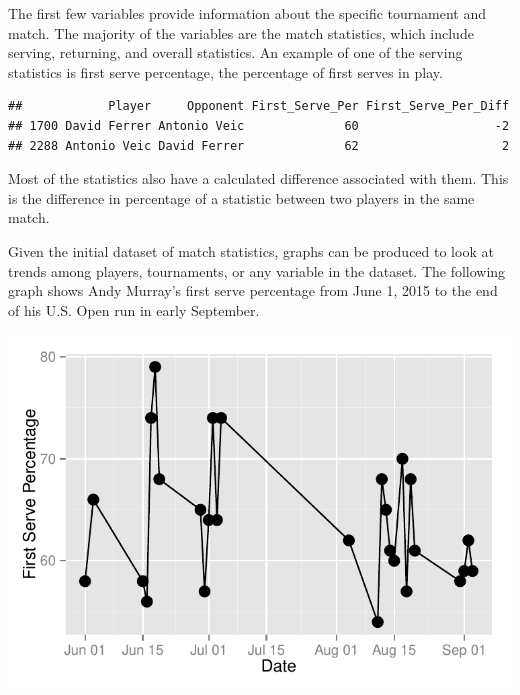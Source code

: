 \documentclass{article}\usepackage[]{graphicx}\usepackage[]{color}
\makeatletter
\def\maxwidth{ %
  \ifdim\Gin@nat@width>\linewidth
    \linewidth
  \else
    \Gin@nat@width
  \fi
}
\newenvironment{kframe}{%
 \def\at@end@of@kframe{}%
 \ifinner\ifhmode%
  \def\at@end@of@kframe{\end{minipage}}%
  \begin{minipage}{\columnwidth}%
 \fi\fi%
 \def\FrameCommand##1{\hskip\@totalleftmargin \hskip-\fboxsep
 \colorbox{shadecolor}{##1}\hskip-\fboxsep
     \hskip-\linewidth \hskip-\@totalleftmargin \hskip\columnwidth}%
 \MakeFramed {\advance\hsize-\width
   \@totalleftmargin\z@ \linewidth\hsize
   \@setminipage}}%
 {\par\unskip\endMakeFramed%
 \at@end@of@kframe}
\newenvironment{knitrout}{}{} %
\numberwithin{equation}{section} %
\makeatother
\begin{document}
The first few variables provide information about the specific tournament and match.  The majority of the variables are the match statistics, which include serving, returning, and overall statistics.  An example of one of the serving statistics is first serve percentage, the percentage of first serves in play.

\begin{knitrout}
\color{fgcolor}\begin{kframe}
\begin{verbatim}
##            Player     Opponent First_Serve_Per First_Serve_Per_Diff
## 1700 David Ferrer Antonio Veic              60                   -2
## 2288 Antonio Veic David Ferrer              62                    2
\end{verbatim}
\end{kframe}
\end{knitrout}

Most of the statistics also have a calculated difference associated with them.  This is the difference in percentage of a statistic between two players in the same match.

Given the initial dataset of match statistics, graphs can be produced to look at trends among players, tournaments, or any variable in the dataset.  The following graph shows Andy Murray's first serve percentage from June 1, 2015 to the end of his U.S. Open run in early September.

\begin{knitrout}
\color{fgcolor}

{\centering \includegraphics[width=\maxwidth]{figure/murray-1} 

}



\end{knitrout}
\end{document}
